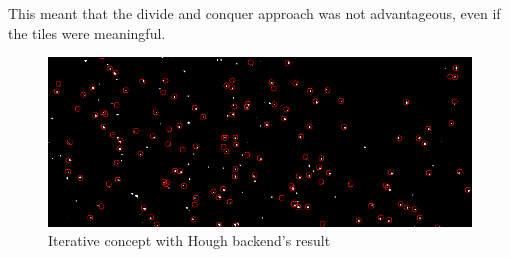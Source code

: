 This meant that the divide and conquer approach was not advantageous, even if the tiles were meaningful.

\begin{figure}
	\centerline{\includegraphics[width=\locateimgsize]{images/locate/iterative-Hough.png}}
	\caption{\centering Iterative concept with Hough backend's result}
	\label{fig:locate:iterative}
\end{figure}
